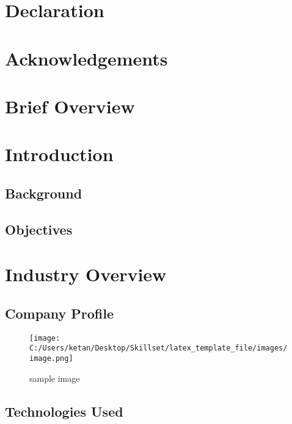 \documentclass[a4paper,11pt,oneside]{report}
\numberwithin{equation}{section}
\begin{document}
\newpage
\chapter*{Declaration}
\lipsum[1]

\newpage
\chapter*{Acknowledgements}
\lipsum[2]

\newpage
{}
\chapter*{Brief Overview}
\lipsum[3]

\newpage
\tableofcontents 

\newpage
\listoffigures

\newpage
{}

\chapter{Introduction}
\section{Background}
\lipsum[4]
\section{Objectives}
\lipsum[5]

\chapter{Industry Overview}
\section{Company Profile}
\begin{figure}[h!]
    \centering
    \texttt{[image: C:/Users/ketan/Desktop/Skillset/latex\_template\_file/images/image.png]}
    \caption{sample image}
    \label{fig:sample_image}
\end{figure}

\lipsum[6]
\section{Technologies Used}
\lipsum[7]
\end{document}
